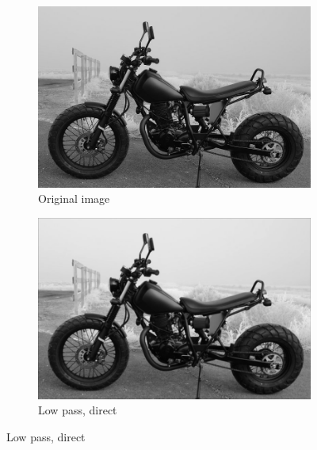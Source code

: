 \documentclass[12pt]{amsart}
\theoremstyle{definition}
\theoremstyle{remark}
\numberwithin{thm}{section}
\begin{document}
\begin{figure}[h] \centering 
\begin{subfigure}[b]{0.4\textwidth} \includegraphics[width=\textwidth]{motor_original.png} \caption{Original image} %
\end{subfigure}
\begin{subfigure}[b]{0.4\textwidth} \includegraphics[width=\textwidth]{motor_direct.png} \caption{Low pass, direct}\end{subfigure}


\end{figure}
\end{document}
